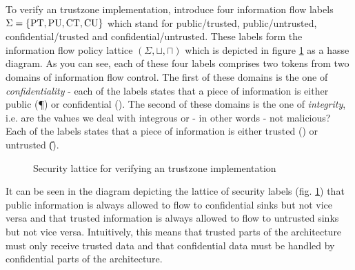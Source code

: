 \begin{example}
    To verify an \gls{trustzone} implementation, \citeauthor{Ferraiuolo17} introduce four information flow labels $ \Sigma = \{ \text{PT}, \text{PU}, \text{CT}, \text{CU} \} $ which stand for public/trusted, public/untrusted, confidential/trusted and confidential/untrusted.
    These labels form the information flow policy lattice $ (\Sigma, \sqcup, \sqcap) $ which is depicted in figure \ref{fig:sec-lattice} as a hasse diagram.
    As you can see, each of these four labels comprises two tokens from two domains of information flow control.
    The first of these domains is the one of \textit{confidentiality} - each of the labels states that a piece of information is either public (\P{}) or confidential (\C{}).
    The second of these domains is the one of \textit{integrity}, i.e. are the values we deal with integrous or - in other words - not malicious?
    Each of the labels states that a piece of information is either trusted (\T{}) or untrusted (\U{}).

    \begin{figure}
        \centering
        \caption{Security lattice for verifying an \gls{trustzone} implementation \cite{Ferraiuolo17}}
        \label{fig:sec-lattice}
    \end{figure}

    It can be seen in the diagram depicting the lattice of security labels (fig. \ref{fig:sec-lattice}) that public information is always allowed to flow to confidential sinks but not vice versa and that trusted information is always allowed to flow to untrusted sinks but not vice versa.
    Intuitively, this means that trusted parts of the architecture must only receive trusted data and that confidential data must be handled by confidential parts of the architecture.
\end{example}

